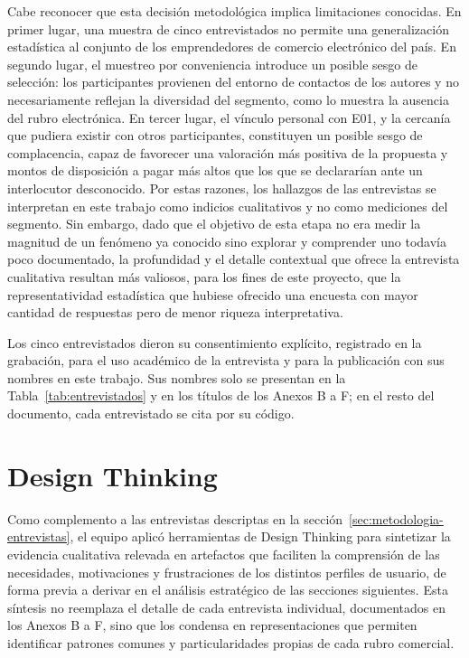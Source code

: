 Cabe reconocer que esta decisión metodológica implica limitaciones conocidas. En primer lugar, una muestra de cinco entrevistados no permite una generalización estadística al conjunto de los emprendedores de comercio electrónico del país. En segundo lugar, el muestreo por conveniencia introduce un posible sesgo de selección: los participantes provienen del entorno de contactos de los autores y no necesariamente reflejan la diversidad del segmento, como lo muestra la ausencia del rubro electrónica. En tercer lugar, el vínculo personal con E01, y la cercanía que pudiera existir con otros participantes, constituyen un posible sesgo de complacencia, capaz de favorecer una valoración más positiva de la propuesta y montos de disposición a pagar más altos que los que se declararían ante un interlocutor desconocido. Por estas razones, los hallazgos de las entrevistas se interpretan en este trabajo como indicios cualitativos y no como mediciones del segmento. Sin embargo, dado que el objetivo de esta etapa no era medir la magnitud de un fenómeno ya conocido sino explorar y comprender uno todavía poco documentado, la profundidad y el detalle contextual que ofrece la entrevista cualitativa resultan más valiosos, para los fines de este proyecto, que la representatividad estadística que hubiese ofrecido una encuesta con mayor cantidad de respuestas pero de menor riqueza interpretativa.

Los cinco entrevistados dieron su consentimiento explícito, registrado en la grabación, para el uso académico de la entrevista y para la publicación con sus nombres en este trabajo. Sus nombres solo se presentan en la Tabla~\ref{tab:entrevistados} y en los títulos de los Anexos B a F; en el resto del documento, cada entrevistado se cita por su código.

\section{Design Thinking}
\label{sec:design-thinking}

Como complemento a las entrevistas descriptas en la sección~\ref{sec:metodologia-entrevistas}, el equipo aplicó herramientas de Design Thinking para sintetizar la evidencia cualitativa relevada en artefactos que faciliten la comprensión de las necesidades, motivaciones y frustraciones de los distintos perfiles de usuario, de forma previa a derivar en el análisis estratégico de las secciones siguientes. Esta síntesis no reemplaza el detalle de cada entrevista individual, documentados en los Anexos B a F, sino que los condensa en representaciones que permiten identificar patrones comunes y particularidades propias de cada rubro comercial.

